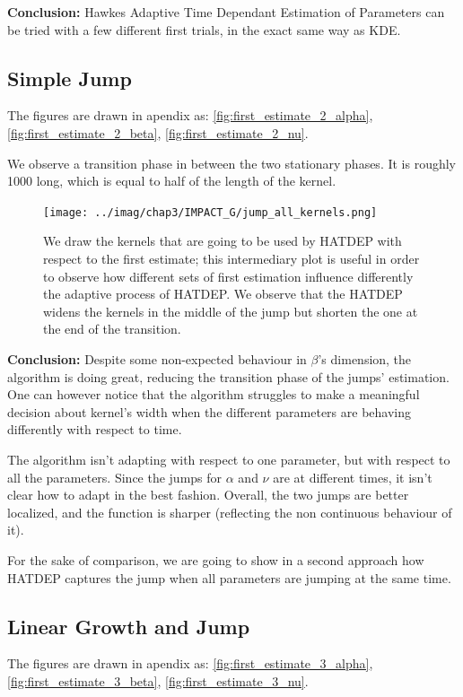 \documentclass[11pt]{book}
\begin{document}
\textbf{Conclusion:} Hawkes Adaptive Time Dependant Estimation of Parameters can be tried with a few different first trials, in the exact same way as KDE.




\subsection{Simple Jump}
The figures are drawn in apendix as: \ref{fig:first_estimate_2_alpha}, \ref{fig:first_estimate_2_beta}, \ref{fig:first_estimate_2_nu}.

We observe a transition phase in between the two stationary phases. It is roughly 1000 long, which is equal to half of the length of the kernel.




\begin{figure}
\centering
\texttt{[image: ../imag/chap3/IMPACT\_G/jump\_all\_kernels.png]}
\caption{We draw the kernels that are going to be used by HATDEP with respect to the first estimate; this intermediary plot is useful in order to observe how different sets of first estimation influence differently the adaptive process of HATDEP. We observe that the HATDEP widens the kernels in the middle of the jump but shorten the one at the end of the transition.}
\label{fig:impact_g_jump}
\end{figure}


\textbf{Conclusion:} Despite some non-expected behaviour in $\beta$'s dimension, the algorithm is doing great, reducing the transition phase of the jumps' estimation. One can however notice that the algorithm struggles to make a meaningful decision about kernel's width when the different parameters are behaving differently with respect to time. 

\begin{remarque}
The algorithm isn't adapting with respect to one parameter, but with respect to all the parameters. Since the jumps for $\alpha$ and $\nu$ are at different times, it isn't clear how to adapt in the best fashion. Overall, the two jumps are better localized, and the function is sharper (reflecting the non continuous behaviour of it).

For the sake of comparison, we are going to show in a second approach how HATDEP captures the jump when all parameters are jumping at the same time.
\end{remarque}



\subsection{Linear Growth and Jump}
The figures are drawn in apendix as: \ref{fig:first_estimate_3_alpha}, \ref{fig:first_estimate_3_beta}, \ref{fig:first_estimate_3_nu}.
\end{document}
